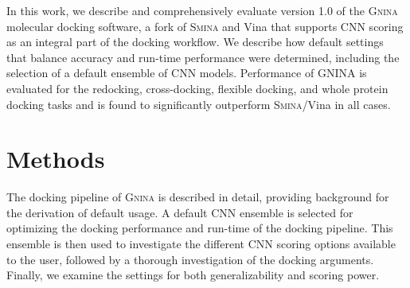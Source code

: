 \documentclass[journal=jcisd8,manuscript=article]{achemso}
\begin{document}
In this work, we describe and comprehensively evaluate version 1.0 of the \textsc{Gnina} molecular docking software, a fork of \textsc{Smina}\cite{koes2013lessons} and Vina\cite{trott2010autodock} that supports CNN scoring as an integral part of the docking workflow. We describe how default settings that balance accuracy and run-time performance were determined, including the selection of a default ensemble of CNN models. Performance of \textsc{GNINA} is evaluated for the redocking, cross-docking, flexible docking, and whole protein docking tasks and is found to significantly outperform \textsc{Smina}/Vina in all cases.



\section{Methods}

The docking pipeline of \textsc{Gnina} is described in detail, providing background for the derivation of default usage. A default CNN ensemble is selected for optimizing the docking performance and run-time of the docking pipeline. This ensemble is then used to investigate the different CNN scoring options available to the user, followed by a thorough investigation of the docking arguments. Finally, we examine the settings for both generalizability and scoring power.
\end{document}
